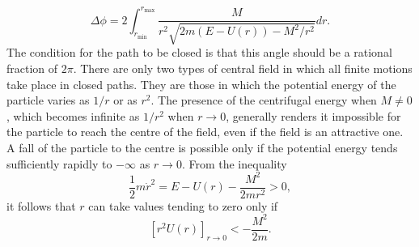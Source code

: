 \[\Delta \phi = 2 \int_{r_{\mathrm{min}}}^{r_{\mathrm{max}}} \frac{M}{r^2 \sqrt{2m(E-U(r))-M^2/r^2}} dr.\]
The condition for the path to be closed is that this angle should be a rational fraction of $2\pi$. There are only two types of central field in which all finite motions take place in closed paths. They are those in which the potential energy of the particle varies as ${1}/{r}$ or as $r^2$.
The presence of the centrifugal energy when $M \neq 0$, which becomes infinite as ${1}/{r^2}$ when $r \to 0$, generally renders it impossible for the particle to reach the centre of the field, even if the field is an attractive one. 
A fall of the particle to the centre is possible only if the potential energy tends sufficiently rapidly to $-\infty$ as $r \to 0$. From the inequality
\[\frac{1}{2} m\dot{r}^2 = E - U(r) - \frac{M^2}{2mr^2} > 0,\]
it follows that $r$ can take values tending to zero only if
\[[r^2 U(r)]_{r\to 0} < -\frac{M^2}{2m}.\]

